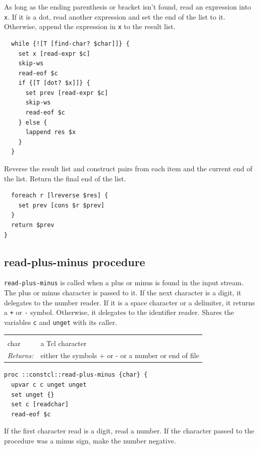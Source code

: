 \documentclass[a5paper,draft]{memoir}
\begin{document}
As long as the ending parenthesis or bracket isn't found, read an expression into \texttt{x}. If it is a dot, read another expression and set the end of the list to it. Otherwise, append the expression in \texttt{x} to the result list.

\begin{lstlisting}
  while {![T [find-char? $char]]} {
    set x [read-expr $c]
    skip-ws
    read-eof $c
    if {[T [dot? $x]]} {
      set prev [read-expr $c]
      skip-ws
      read-eof $c
    } else {
      lappend res $x
    }
  }
\end{lstlisting}

Reverse the result list and construct pairs from each item and the current end of the list. Return the final end of the list.

\begin{lstlisting}
  foreach r [lreverse $res] {
    set prev [cons $r $prev]
  }
  return $prev
}
\end{lstlisting}

\subsection{read-plus-minus procedure}
\label{readplusminus-procedure}

\texttt{read-plus-minus} is called when a plus or minus is found in the input stream. The plus or minus character is passed to it. If the next character is a digit, it delegates to the number reader. If it is a space character or a delimiter, it returns a \texttt{+} or \texttt{-} symbol. Otherwise, it delegates to the identifier reader. Shares the variables \texttt{c} and \texttt{unget} with its caller.

\noindent\begin{tabular}{ |p{1.9cm} p{6.5cm}| }
\hline
\rowcolor[HTML]{CCCCCC} \multicolumn{2}{|l|}{\textbf{read-plus-minus (internal)}} \\
char & a Tcl character \\
\textit{Returns:} & either the symbols + or - or a number or end of file \\
\hline
\end{tabular}

\begin{lstlisting}
proc ::constcl::read-plus-minus {char} {
  upvar c c unget unget
  set unget {}
  set c [readchar]
  read-eof $c
\end{lstlisting}

If the first character read is a digit, read a number. If the character passed to the procedure was a minus sign, make the number negative.
\end{document}
